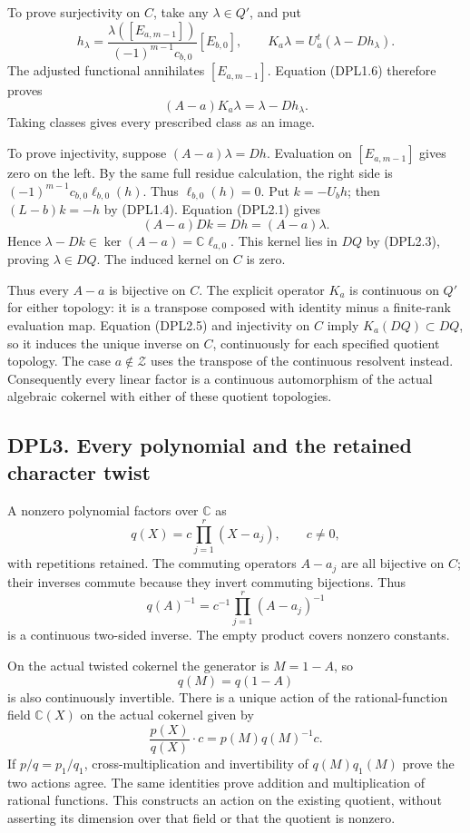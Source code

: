 To prove surjectivity on \(C\), take any \(\lambda\in Q'\), and put \[
h_\lambda=
\frac{\lambda([E_{a,m-1}])}{(-1)^{m-1}c_{b,0}}[E_{b,0}],
\qquad
K_a\lambda=U_a^t(\lambda-Dh_\lambda).
\tag{DPL2.4}
\] The adjusted functional annihilates \([E_{a,m-1}]\). Equation
(DPL1.6) therefore proves \[
(A-a)K_a\lambda=\lambda-Dh_\lambda.
\tag{DPL2.5}
\] Taking classes gives every prescribed class as an image.

To prove injectivity, suppose \((A-a)\lambda=Dh\). Evaluation on
\([E_{a,m-1}]\) gives zero on the left. By the same full residue
calculation, the right side is \((-1)^{m-1}c_{b,0}\ell_{b,0}(h)\). Thus
\(\ell_{b,0}(h)=0\). Put \(k=-U_bh\); then \((L-b)k=-h\) by (DPL1.4).
Equation (DPL2.1) gives \[
(A-a)Dk=Dh=(A-a)\lambda.
\] Hence \(\lambda-Dk\in\ker(A-a)=\mathbb C\ell_{a,0}\). This kernel
lies in \(DQ\) by (DPL2.3), proving \(\lambda\in DQ\). The induced
kernel on \(C\) is zero.

Thus every \(A-a\) is bijective on \(C\). The explicit operator \(K_a\)
is continuous on \(Q'\) for either topology: it is a transpose composed
with identity minus a finite-rank evaluation map. Equation (DPL2.5) and
injectivity on \(C\) imply \(K_a(DQ)\subset DQ\), so it induces the
unique inverse on \(C\), continuously for each specified quotient
topology. The case \(a\notin\mathscr Z\) uses the transpose of the
continuous resolvent instead. Consequently every linear factor is a
continuous automorphism of the actual algebraic cokernel with either of
these quotient topologies.

\subsection{DPL3. Every polynomial and the retained character
twist}\label{dpl3.-every-polynomial-and-the-retained-character-twist}

A nonzero polynomial factors over \(\mathbb C\) as \[
q(X)=c\prod_{j=1}^r(X-a_j),\qquad c\ne0,
\tag{DPL3.1}
\] with repetitions retained. The commuting operators \(A-a_j\) are all
bijective on \(C\); their inverses commute because they invert commuting
bijections. Thus \[
q(A)^{-1}=c^{-1}\prod_{j=1}^r(A-a_j)^{-1}
\tag{DPL3.2}
\] is a continuous two-sided inverse. The empty product covers nonzero
constants.

On the actual twisted cokernel the generator is \(M=1-A\), so \[
q(M)=q(1-A)
\tag{DPL3.3}
\] is also continuously invertible. There is a unique action of the
rational-function field \(\mathbb C(X)\) on the actual cokernel given by
\[
\frac{p(X)}{q(X)}\cdot c=p(M)q(M)^{-1}c .
\tag{DPL3.4}
\] If \(p/q=p_1/q_1\), cross-multiplication and invertibility of
\(q(M)q_1(M)\) prove the two actions agree. The same identities prove
addition and multiplication of rational functions. This constructs an
action on the existing quotient, without asserting its dimension over
that field or that the quotient is nonzero.

